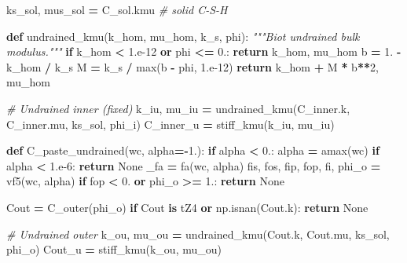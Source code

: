 \documentclass[
  a4paper,
  numbers=noendperiod,
  DIV=12]{scrreprt}
\newenvironment{Shaded}{\begin{snugshade}}{\end{snugshade}}
\newcommand{\BuiltInTok}[1]{#1}
\newcommand{\CommentTok}[1]{\textcolor[rgb]{0.56,0.35,0.01}{\textit{#1}}}
\newcommand{\ControlFlowTok}[1]{\textcolor[rgb]{0.13,0.29,0.53}{\textbf{#1}}}
\newcommand{\DecValTok}[1]{\textcolor[rgb]{0.00,0.00,0.81}{#1}}
\newcommand{\FloatTok}[1]{\textcolor[rgb]{0.00,0.00,0.81}{#1}}
\newcommand{\KeywordTok}[1]{\textcolor[rgb]{0.13,0.29,0.53}{\textbf{#1}}}
\newcommand{\NormalTok}[1]{#1}
\newcommand{\OperatorTok}[1]{\textcolor[rgb]{0.81,0.36,0.00}{\textbf{#1}}}
\newcommand{\VariableTok}[1]{\textcolor[rgb]{0.00,0.00,0.00}{#1}}
\begin{document}
\begin{Shaded}
\begin{Highlighting}[]
\NormalTok{ks\_sol, mus\_sol }\OperatorTok{=}\NormalTok{ C\_sol.kmu   }\CommentTok{\# solid C{-}S{-}H}

\KeywordTok{def}\NormalTok{ undrained\_kmu(k\_hom, mu\_hom, k\_s, phi):}
    \CommentTok{"""Biot undrained bulk modulus."""}
    \ControlFlowTok{if}\NormalTok{ k\_hom }\OperatorTok{\textless{}} \FloatTok{1.e{-}12} \KeywordTok{or}\NormalTok{ phi }\OperatorTok{\textless{}=} \FloatTok{0.}\NormalTok{:}
        \ControlFlowTok{return}\NormalTok{ k\_hom, mu\_hom}
\NormalTok{    b }\OperatorTok{=} \FloatTok{1.} \OperatorTok{{-}}\NormalTok{ k\_hom }\OperatorTok{/}\NormalTok{ k\_s}
\NormalTok{    M }\OperatorTok{=}\NormalTok{ k\_s }\OperatorTok{/} \BuiltInTok{max}\NormalTok{(b }\OperatorTok{{-}}\NormalTok{ phi, }\FloatTok{1.e{-}12}\NormalTok{)}
    \ControlFlowTok{return}\NormalTok{ k\_hom }\OperatorTok{+}\NormalTok{ M }\OperatorTok{*}\NormalTok{ b}\OperatorTok{**}\DecValTok{2}\NormalTok{, mu\_hom}

\CommentTok{\# Undrained inner (fixed)}
\NormalTok{k\_iu, mu\_iu }\OperatorTok{=}\NormalTok{ undrained\_kmu(C\_inner.k, C\_inner.mu, ks\_sol, phi\_i)}
\NormalTok{C\_inner\_u }\OperatorTok{=}\NormalTok{ stiff\_kmu(k\_iu, mu\_iu)}

\KeywordTok{def}\NormalTok{ C\_paste\_undrained(wc, alpha}\OperatorTok{={-}}\FloatTok{1.}\NormalTok{):}
    \ControlFlowTok{if}\NormalTok{ alpha }\OperatorTok{\textless{}} \FloatTok{0.}\NormalTok{: alpha }\OperatorTok{=}\NormalTok{ amax(wc)}
    \ControlFlowTok{if}\NormalTok{ alpha }\OperatorTok{\textless{}} \FloatTok{1.e{-}6}\NormalTok{: }\ControlFlowTok{return} \VariableTok{None}
\NormalTok{    \_fa }\OperatorTok{=}\NormalTok{ fa(wc, alpha)}
\NormalTok{    fis, fos, fip, fop, fi, phi\_o }\OperatorTok{=}\NormalTok{ vf5(wc, alpha)}
    \ControlFlowTok{if}\NormalTok{ fop }\OperatorTok{\textless{}} \FloatTok{0.} \KeywordTok{or}\NormalTok{ phi\_o }\OperatorTok{\textgreater{}=} \FloatTok{1.}\NormalTok{: }\ControlFlowTok{return} \VariableTok{None}

\NormalTok{    Cout }\OperatorTok{=}\NormalTok{ C\_outer(phi\_o)}
    \ControlFlowTok{if}\NormalTok{ Cout }\KeywordTok{is}\NormalTok{ tZ4 }\KeywordTok{or}\NormalTok{ np.isnan(Cout.k): }\ControlFlowTok{return} \VariableTok{None}

    \CommentTok{\# Undrained outer}
\NormalTok{    k\_ou, mu\_ou }\OperatorTok{=}\NormalTok{ undrained\_kmu(Cout.k, Cout.mu, ks\_sol, phi\_o)}
\NormalTok{    Cout\_u }\OperatorTok{=}\NormalTok{ stiff\_kmu(k\_ou, mu\_ou)}


\end{Highlighting}
\end{Shaded}
\end{document}
